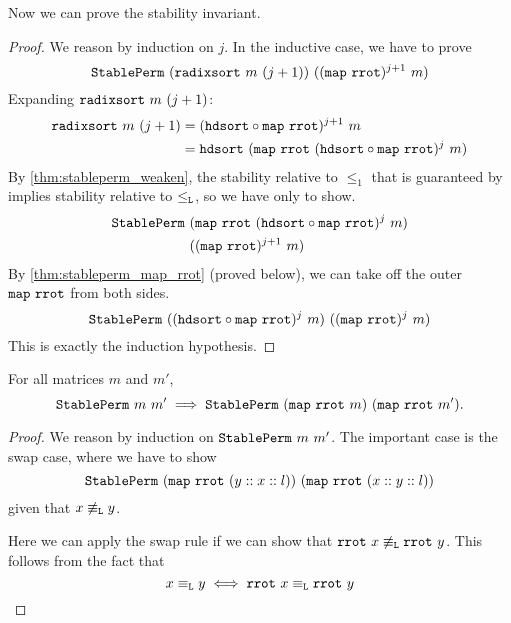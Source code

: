 \documentclass[sigplan,10pt,anonymous,review]{thesis}
\begin{document}
Now we can prove the stability invariant.
\radixsortstableinv
\begin{proof}
  We reason by induction on $j$. In the inductive case, we have to prove
  \begin{equation*}
    \texttt{\textup{StablePerm}}~(\texttt{\textup{radixsort}}~m~(j+1))~((\texttt{\textup{map}}~\texttt{\textup{rrot}})^{j+1}~m)
  \end{equation*}
  Expanding $\texttt{\textup{radixsort}}~m~(j+1)$:
  \begin{align*}
     \texttt{\textup{radixsort}}~m~(j+1)
    ={}& (\texttt{\textup{hdsort}} \circ \texttt{\textup{map}}~\texttt{\textup{rrot}})^{j+1}~m \\
    ={}& \texttt{\textup{hdsort}}~(\texttt{\textup{map}}~\texttt{\textup{rrot}}~(\texttt{\textup{hdsort}} \circ \texttt{\textup{map}}~\texttt{\textup{rrot}})^j~m)
  \end{align*}
  By \cref{thm:stableperm_weaken}, the stability relative to $\le_1$
  that is guaranteed by  implies stability relative to
  $\le_{\texttt{\textup{L}}}$, so we have only to show.
  \begin{align*}
    \texttt{\textup{StablePerm}}~&(\texttt{\textup{map}}~\texttt{\textup{rrot}}~(\texttt{\textup{hdsort}} \circ \texttt{\textup{map}}~\texttt{\textup{rrot}})^j~m) \\
                     &((\texttt{\textup{map}}~\texttt{\textup{rrot}})^{j+1}~m)
  \end{align*}
  By \cref{thm:stableperm_map_rrot} (proved below), we can take off
  the outer $\texttt{\textup{map}}~\texttt{\textup{rrot}}$ from both sides.
  \begin{equation*}
    \texttt{\textup{StablePerm}}~
    ((\texttt{\textup{hdsort}} \circ \texttt{\textup{map}}~\texttt{\textup{rrot}})^j~m)~((\texttt{\textup{map}}~\texttt{\textup{rrot}})^j~m)
  \end{equation*}
  This is exactly the induction hypothesis.
\end{proof}

\begin{lemma}
  \label{thm:stableperm_map_rrot}
  For all matrices $m$ and $m'$,
  \begin{equation*}
    \texttt{\textup{StablePerm}}~m~m' \implies
    \texttt{\textup{StablePerm}}~(\texttt{\textup{map}}~\texttt{\textup{rrot}}~m)~(\texttt{\textup{map}}~\texttt{\textup{rrot}}~m').
  \end{equation*}
\end{lemma}
\begin{proof}
  We reason by induction on $\texttt{\textup{StablePerm}}~m~m'$. The important
  case is the swap case, where we have to show
  \begin{equation*}
    \texttt{\textup{StablePerm}}~(\texttt{\textup{map}}~\texttt{\textup{rrot}}~(y :: x :: l))~(\texttt{\textup{map}}~\texttt{\textup{rrot}}~(x :: y :: l))
  \end{equation*}
  given that $x \not\equiv_{\texttt{\textup{L}}} y$.

  Here we can apply the swap rule if we can show that $\texttt{\textup{rrot}}~x
  \not\equiv_{\texttt{\textup{L}}} \texttt{\textup{rrot}}~y$. This follows from the fact that
  \begin{equation*}
    x \equiv_{\texttt{\textup{L}}} y \iff \texttt{\textup{rrot}}~x \equiv_{\texttt{\textup{L}}} \texttt{\textup{rrot}}~y \qedhere
  \end{equation*}
\end{proof}
\end{document}
